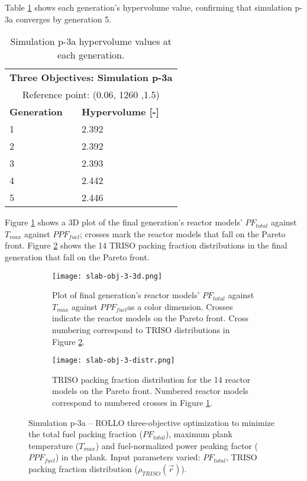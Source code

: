 Table \ref{tab:p3a-hypervolume} shows each generation's hypervolume value, 
confirming that simulation p-3a converges by generation 5. 
\begin{table}[htbp!]
    \centering
    \onehalfspacing
    \caption{Simulation p-3a hypervolume values at each generation.}
	\label{tab:p3a-hypervolume}
    \footnotesize
    \begin{tabular}{ll}
    \hline 
    \multicolumn{2}{c}{\textbf{Three Objectives: Simulation p-3a}} \\
    \multicolumn{2}{c}{Reference point: (0.06, 1260 ,1.5)} \\
    \hline 
    \textbf{Generation} & \textbf{Hypervolume [-]} \\
    \hline
    1 & 2.392 \\
    2 & 2.392 \\
    3 & 2.393 \\
    4 & 2.442 \\
    5 & 2.446 \\
    \hline
    \end{tabular}
\end{table}

Figure \ref{fig:slab-obj-3-3d} shows a 3D plot of the final generation's reactor models' 
$PF_{total}$ against $T_{max}$ against $PPF_{fuel}$; crosses mark the reactor models 
that fall on the Pareto front.
Figure \ref{fig:slab-obj-3-distr} shows the 14 TRISO packing fraction distributions in 
the final generation that fall on the Pareto front. 
\begin{figure}[htbp!]
    \begin{subfigure}{\textwidth}
        \centering
        \texttt{[image: slab-obj-3-3d.png]}
        \caption{Plot of final generation's reactor models' $PF_{total}$ against 
        $T_{max}$ against $PPF_{fuel}$as a color dimension. 
        Crosses indicate the reactor models on the Pareto front. 
        Cross numbering correspond to TRISO distributions in Figure 
        \ref{fig:slab-obj-3-distr}.}
        \label{fig:slab-obj-3-3d} 
    \end{subfigure}
    \begin{subfigure}{\textwidth}
        \texttt{[image: slab-obj-3-distr.png]}
        \caption{TRISO packing fraction distribution for the 14 reactor models on the 
        Pareto front. Numbered reactor models correspond to numbered crosses in Figure 
        \ref{fig:slab-obj-3-3d}.}
        \label{fig:slab-obj-3-distr} 
    \end{subfigure}
    \caption{Simulation p-3a -- ROLLO three-objective optimization to minimize the total 
    fuel packing fraction ($PF_{total}$), maximum plank temperature ($T_{max}$) and 
    fuel-normalized power peaking factor ($PPF_{fuel}$) in the plank. 
    Input parameters varied: $PF_{total}$, TRISO packing fraction distribution
    ($\rho_{TRISO}(\vec{r})$).}
    \label{fig:slab-obj-3}
\end{figure}

